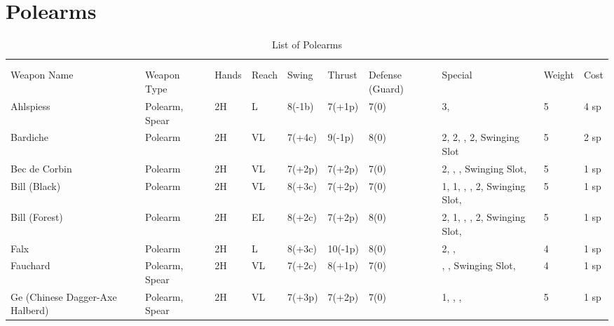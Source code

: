 \documentclass[oneside,11pt,english]{book}
\begin{document}
\section{Polearms}\vspace{-15pt}
\begin{longtabu} to 1\linewidth {X[2,l]XX[-1,c]X[-1,c]XXX[-1,c]X[2,l]X[-3,c]X[-3,r]}
	\captionsetup{labelformat=blank,textformat=empty}
	\caption{List of Polearms}\vspace{-15pt}\\
	\label{tab:Polearms}\\\endfirsthead
Weapon Name						&Weapon Type			&Hands	&Reach	&Swing		&Thrust		&Defense (Guard)	&Special																	&Weight	&Cost\\\toprule\endhead
Ahlspiess						&Polearm, Spear 		&2H		&L		&8(-1b)		&7(+1p)		&7(0)				& 3,														&5		&4 sp\\
Bardiche						&Polearm				&2H		&VL		&7(+4c)		&9(-1p)		&8(0)				& 2,  2, ,  2, Swinging Slot				&5		&2 sp\\
Bec de Corbin					&Polearm				&2H		&VL		&7(+2p)		&7(+2p)		&7(0)				& 2, , , Swinging Slot, 					&5		&1 sp\\
Bill (Black)					&Polearm				&2H		&VL		&8(+3c)		&7(+2p)		&7(0)				& 1,  1, , ,  2, Swinging Slot,		&5		&1 sp\\
Bill (Forest)					&Polearm				&2H		&EL		&8(+2c)		&7(+2p)		&8(0)				& 2,  1, , ,  2, Swinging Slot,		&5		&1 sp\\
Falx							&Polearm				&2H		&L		&8(+3c)		&10(-1p)	&8(0)				& 2, , 									&4		&1 sp\\
Fauchard 						&Polearm, Spear			&2H		&VL		&7(+2c)		&8(+1p) 	&7(0)				&, , Swinging Slot,								&4		&1 sp\\
Ge (Chinese Dagger-Axe Halberd)	&Polearm, Spear			&2H		&VL		&7(+3p)		&7(+2p) 	&7(0)				& 1, , ,											&5		&1 sp\\

\end{longtabu}
\end{document}
